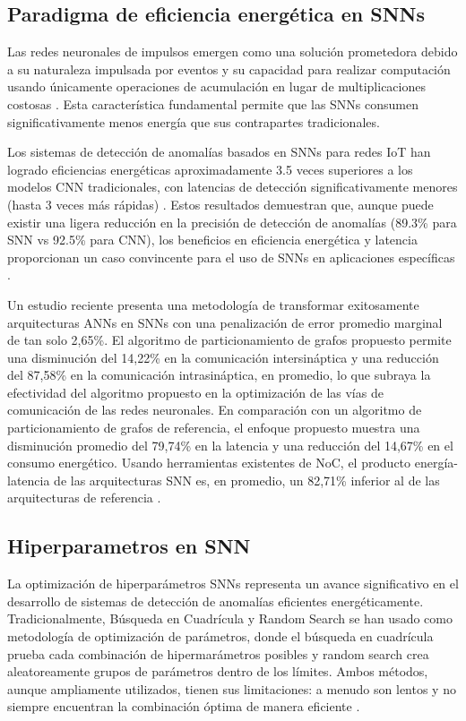 \subsection{Paradigma de eficiencia energética en SNNs}

Las redes neuronales de impulsos emergen como una solución prometedora debido a su naturaleza impulsada por eventos y su capacidad para realizar computación usando únicamente operaciones de acumulación en lugar de multiplicaciones costosas \cite{jang_bisnn_2021}. Esta característica fundamental permite que las SNNs consumen significativamente menos energía que sus contrapartes tradicionales.

Los sistemas de detección de anomalías basados en SNNs para redes IoT han logrado eficiencias energéticas aproximadamente 3.5 veces superiores a los modelos CNN tradicionales, con latencias de detección significativamente menores (hasta 3 veces más rápidas) \cite{maddula_ai-driven_2024}. Estos resultados demuestran que, aunque puede existir una ligera reducción en la precisión de detección de anomalías (89.3\% para SNN vs 92.5\% para CNN), los beneficios en eficiencia energética y latencia proporcionan un caso convincente para el uso de SNNs en aplicaciones específicas \cite{maddula_ai-driven_2024}.

Un estudio reciente presenta una metodología de transformar exitosamente arquitecturas ANNs en SNNs con una penalización de error promedio marginal de tan solo 2,65\%. El algoritmo de particionamiento de grafos propuesto permite una disminución del 14,22\% en la comunicación intersináptica y una reducción del 87,58\% en la comunicación intrasináptica, en promedio, lo que subraya la efectividad del algoritmo propuesto en la optimización de las vías de comunicación de las redes neuronales. En comparación con un algoritmo de particionamiento de grafos de referencia, el enfoque propuesto muestra una disminución promedio del 79,74\% en la latencia y una reducción del 14,67\% en el consumo energético. Usando herramientas existentes de NoC, el producto energía-latencia de las arquitecturas SNN es, en promedio, un 82,71\% inferior al de las arquitecturas de referencia \cite{islam_benchmarking_2024}.

\subsection{Hiperparametros en SNN}

La optimización de hiperparámetros SNNs representa un avance significativo en el desarrollo de sistemas de detección de anomalías eficientes energéticamente. Tradicionalmente, Búsqueda en Cuadrícula y Random Search se han usado como metodología de optimización de parámetros, donde el búsqueda en cuadrícula prueba cada combinación de hipermarámetros posibles y random search crea aleatoreamente grupos de parámetros dentro de los límites. Ambos métodos, aunque ampliamente utilizados, tienen sus limitaciones: a menudo son lentos y no siempre encuentran la combinación óptima de manera eficiente \cite{noauthor_optuna_nodate}. 

